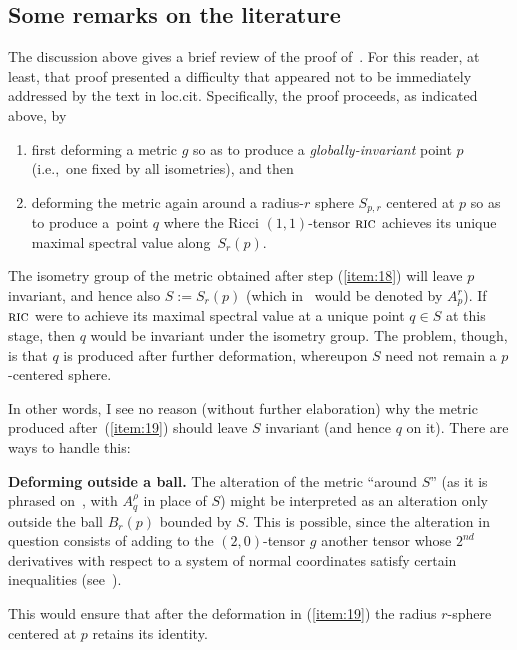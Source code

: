 \documentclass[10pt,a4paper]{amsart}
\numberwithin{equation}{section}
\newcommand{\cat}[1]{\textsc{#1}}
\begin{document}
\subsection{Some remarks on the literature}%

The discussion above gives a brief review of the proof of~\cite[Proposition~8.3]{eb}. For this reader, at least, that proof presented a difficulty that appeared not to be immediately addressed by the text in loc.cit. Specifically, the proof proceeds, as indicated above, by
\begin{enumerate}[(1)]\itemsep=0pt
\item\label{item:18} first deforming a metric $g$ so as to produce a {\it globally-invariant} point $p$ (i.e.,~one fixed by all isometries), and then
\item\label{item:19} deforming the metric again around a radius-$r$ sphere $S_{p,r}$ centered at $p$ so as to produce a~point $q$ where the Ricci $(1,1)$-tensor $\cat{ric}$ achieves its unique maximal spectral value along~$S_r(p)$.
\end{enumerate}

The isometry group of the metric obtained after step (\ref{item:18}) will leave $p$ invariant, and hence also $S:=S_r(p)$ (which in~\cite{eb} would be denoted by $A_p^r$). If $\cat{ric}$ were to achieve its maximal spectral value at a unique point $q\in S$ at this stage, then $q$ would be invariant under the isometry group. The problem, though, is that $q$ is produced after further deformation, whereupon $S$ need not remain a $p$-centered sphere.

In other words, I see no reason (without further elaboration) why the metric produced after~(\ref{item:19}) should leave $S$ invariant (and hence $q$ on it). There are ways to handle this:
\medskip

{\bf Deforming outside a ball.} The alteration of the metric ``around $S$'' (as it is phrased on~\cite[p.~36]{eb}, with $A_q^{\rho}$ in place of $S$) might be interpreted as an alteration only outside the ball $B_r(p)$ bounded by $S$. This is possible, since the alteration in question consists of adding to the $(2,0)$-tensor $g$ another tensor whose $2^{nd}$ derivatives with respect to a system of normal coordinates satisfy certain inequalities (see~\cite[equation (8.4)]{eb}).

This would ensure that after the deformation in (\ref{item:19}) the radius $r$-sphere centered at $p$ retains its identity.
\end{document}
